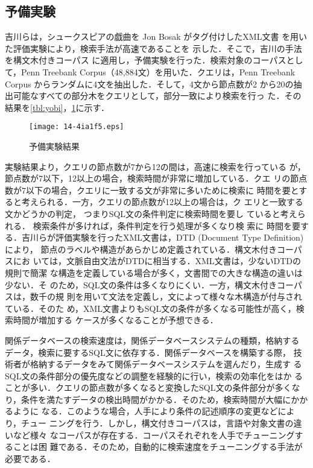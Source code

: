 \documentclass[japanese]{jnlp_1.3e}
\begin{document}
\subsection{予備実験}

吉川らは，シュークスピアの戯曲を Jon Bosak がタグ付けしたXML文書
\cite{bosak:1999:a}を用いた評価実験により，検索手法が高速であることを
示した\cite{yoshikawa:1999:a}．そこで，吉川の手法を構文木付きコーパス
に適用し，予備実験を行った．検索対象のコーパスとして，Penn Treebank
Corpus（48,884文）\cite{marcus:1994:a}を用いた．クエリは，Penn
Treebank Corpus からランダムに4文を抽出した．そして，4文から節点数が2
から20の抽出可能なすべての部分木をクエリとして，部分一致により検索を行っ
た．その結果を\tablename\ref{tbl:yobi}，\figurename\ref{fig:yobi}に示す．


\begin{table}[t]

\end{table}

\begin{figure}[t]
  \begin{center}
\texttt{[image: 14-4ia1f5.eps]}
    \caption{予備実験結果}
    \label{fig:yobi}
  \end{center}
\end{figure}

実験結果より，クエリの節点数が7から12の間は，高速に検索を行っている
が，節点数が7以下，12以上の場合，検索時間が非常に増加している．クエ
リの節点数が7以下の場合，クエリに一致する文が非常に多いために検索に
時間を要とすると考えられる．一方，クエリの節点数が12以上の場合は，ク
エリと一致する文かどうかの判定，
つまりSQL文の条件判定に検索時間を要し
ていると考えられる．
検索条件が多ければ，条件判定を行う処理が多くなり検
索に
時間を要する．吉川らが評価実験を行ったXML文書は，DTD (Document
  Type Definition) により，
節点のラベルや構造があらかじめ定義されている．構文木付きコーパスにお
いては，文脈自由文法がDTDに相当する．XML文書は，少ないDTDの規則で簡潔
な構造を定義している場合が多く，文書間での大きな構造の違いは少ない．そ
のため，SQL文の条件は多くなりにくい．一方，構文木付きコーパスは，数千の規
則を用いて文法を定義し，文によって様々な木構造が付与されている．そのた
め，XML文書よりもSQL文の条件が多くなる可能性が高く，検索時間が増加する
ケースが多くなることが予想できる．

関係データベースの検索速度は，関係データベースシステムの種類，格納する
データ，検索に要するSQL文に依存する．関係データベースを構築する際，
技術者が格納するデータをみて関係データベースシステムを選んだり，生成す
るSQL文の条件部分の優先度などの調整を経験的に行い，検索の効率化をはか
ることが多い．クエリの節点数が多くなると変換したSQL文の条件部分が多くなり，条件を満たすデータの検出時間がかかる．そのため，検索時間が大幅にかかるように
なる．このような場合，人手により条件の記述順序の変更などにより，チュー
ニングを行う．しかし，構文付きコーパスは，言語や対象文書の違いなど様々
なコーパスが存在する．コーパスそれぞれを人手でチューニングすることは困
難である．そのため，自動的に検索速度をチューニングする手法が必要である．
\end{document}
